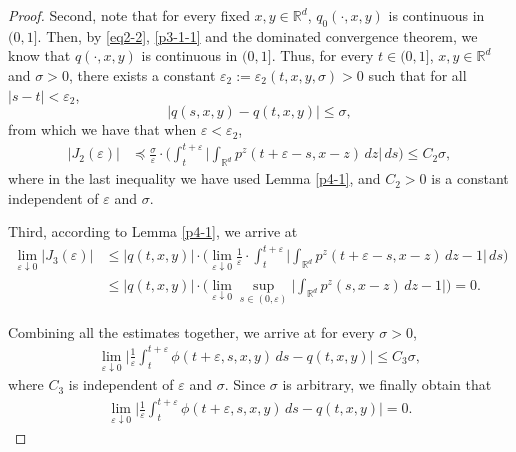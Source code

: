 \documentclass[a4paper,11pt]{amsart}
\renewcommand{\le}{\leqslant}
\newcommand{\R}{\mathds R}
\newcommand{\p}{\preceq}
\newcommand{\e}{ \varepsilon}
\theoremstyle{definition}
\begin{document}
\begin{proof}
Second, note that for every fixed $x,y \in \R^d$,
$q_0(\cdot,x,y)$ is continuous in $(0,1]$. Then, by \eqref{eq2-2}, \eqref{p3-1-1} and the dominated convergence theorem,
we know that $q(\cdot,x,y)$ is continuous in $(0,1]$. Thus, for every $t \in (0,1]$, $x,y \in \R^d$ and $\sigma>0$, there exists a constant $\e_2:=\e_2(t,x,y,\sigma)>0$ such that for all $|s-t|<\e_2$,
\begin{equation*}
|q(s,x,y)-q(t,x,y)|\le \sigma,
\end{equation*}
from which we have that when $\e<\e_2$,
\begin{align*}
|J_2(\e)|&\p \frac{\sigma}{\e}\cdot
\Big(\int_t^{t+\e}\Big|\int_{\R^d}p^z(t+\e-s,x-z)\,dz\Big|\,ds\Big)\le C_2\sigma,
\end{align*}
where in the last inequality we have used Lemma \ref{p4-1}, and
$C_2>0$ is a constant independent of $\e$ and $\sigma$.

Third, according to Lemma \ref{p4-1}, we arrive at
\begin{align*}
\lim_{\e \downarrow 0}|J_3(\e)|&\le
|q(t,x,y)|\cdot \bigg(\lim_{\e \downarrow 0}\frac{1}{\e}
\cdot \int_t^{t+\e}\Big|\int_{\R^d}p^z(t+\e-s,x-z)\,dz-1\Big|\,ds\bigg)\\
&\le |q(t,x,y)|\cdot\bigg(\lim_{\e \downarrow 0}\sup_{s \in (0,\e)}
\Big|\int_{\R^d}p^z(s,x-z)\,dz-1\Big|\bigg)=0.
\end{align*}

Combining all the estimates together, we arrive at for every $\sigma>0$,
\begin{align*}
\lim_{\e \downarrow 0}\Big|\frac{1}{\e}\int_t^{t+\e}\phi(t+\e,s,x,y)\,ds-q(t,x,y)\Big|\le C_3\sigma,
\end{align*}
where $C_3$ is independent of $\e$ and $\sigma$. Since $\sigma$ is arbitrary, we finally obtain that
\begin{equation}\label{t4-1-3}
\begin{split}
\lim_{\e \downarrow 0}\Big|\frac{1}{\e}\int_t^{t+\e}\phi(t+\e,s,x,y)\,ds-q(t,x,y)\Big|=0.
\end{split}
\end{equation}


\end{proof}
\end{document}
